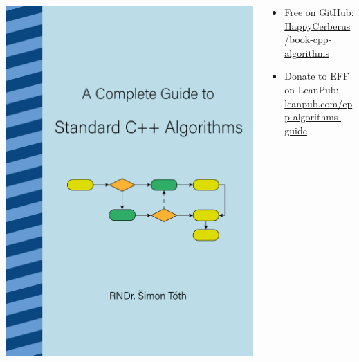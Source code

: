 \documentclass[aspectratio=169]{beamer}
\begin{document}
\begin{frame}{}
    \begin{columns}
        \begin{column}{0.3\textwidth}
            \includegraphics[height=0.8\textheight]{static/book_cover.png}
        \end{column}
        \begin{column}{0.6\textwidth}
            \begin{itemize}
                \item Free on GitHub:\\
                    \href{https://github.com/HappyCerberus/book-cpp-algorithms}{HappyCerberus/book-cpp-algorithms}
                \item Donate to EFF on LeanPub:\\
                    \href{https://leanpub.com/cpp-algorithms-guide}{leanpub.com/cpp-algorithms-guide}
            \end{itemize}
        \end{column}
    \end{columns}
\end{frame}
\end{document}
